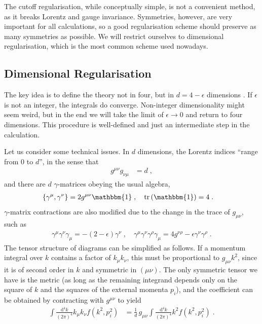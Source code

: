 \documentclass[12pt]{report}
\renewcommand{\d}{\text{d}}
\DeclareMathOperator{\tr}{tr}
\newcommand{\2}{\ensuremath{\sqrt{2}\,}}
\renewcommand{\d}{\ensuremath{\text{d}}}
\begin{document}
{      The cutoff regularisation, while conceptually simple, is not a convenient method, as it
      breaks Lorentz and gauge invariance. Symmetries, however, are very important for all calculations,
      so a good regularisation scheme should preserve as many symmetries as possible. We will
      restrict ourselves to dimensional regularisation, which is the most common scheme used
      nowadays. 
      

      \subsection{Dimensional Regularisation}
      The key idea is to define the theory not in four, but in $d=4-\epsilon$ dimensions \cite{thooft}. 
      If $\epsilon$
      is not an integer, the integrals do converge. 
      Non-integer
      dimensionality might seem weird, but in the end we will take the limit of $\epsilon\to
      0$ and return to four dimensions. This procedure is well-defined and just an intermediate step 
      in the calculation.

      Let us consider some technical issues. In $d$ dimensions, the Lorentz indices
      ``range from 0 to $d$'', in the sense that
      \begin{align}
        g^{\mu\nu} g_{\nu\mu}&=d\;,
      \end{align}
      and there are $d$ $\gamma$-matrices obeying the
      usual algebra,
      \begin{align}
        \left\{ \gamma^\mu, \gamma^\nu\right\} &= 2 g^{\mu\nu} \mathbbm{1}\;,\quad \tr
        \left(\mathbbm{1}\right)=4 \;.
      \end{align}
      $\gamma$-matrix contractions are also modified due to the change in the trace of $g_{\mu\nu}$,
      such as
      \begin{align}
        \gamma^\mu \gamma^\nu \gamma_\mu= -\left(2-\epsilon\right) \gamma^\nu\;, \quad 
        \gamma^\mu\gamma^\nu \gamma^\rho \gamma_\mu= 4 g^{\nu\rho} -\epsilon \gamma^\nu\gamma^\rho\;.
      \end{align}
      The tensor structure of diagrams can be simplified as follows. If a momentum integral over $k$
      contains a factor of $k_\mu k_\nu$, this must be proportional to $g_{\mu\nu} k^2$, since it is
      of second order in $k$ and symmetric in $\left(\mu\nu\right)$. The only symmetric tensor we
      have is the metric (as long as the remaining integrand depends only on the square of $k$ and
      the squares of the external momenta $p_i$), and the coefficient can be obtained by contracting with
      $g^{\mu\nu}$ to yield
      \begin{align}
        \int \frac{\d^4 k}{\left(2\pi\right)^4} k_\mu k_\nu f\!\left(k^2, p^2_i\right) &=
        \frac{1}{d}\, g_{\mu\nu} \int
        \frac{\d^4 k}{\left(2\pi\right)^4} k^2 f\!\left(k^2, p^2_i\right)\;. 
      \end{align}

}
\end{document}
